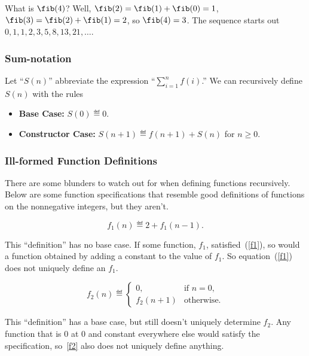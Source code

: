 What is $\fib(4)$?  Well, $\fib(2) =
\fib(1)+\fib(0) = 1$, $\fib(3) =
\fib(2)+\fib(1) = 2$, so $\fib(4) = 3$.  The sequence
starts out $0, 1, 1, 2, 3, 5, 8, 13, 21,\dots$.

\subsubsection{Sum-notation}

Let ``$S(n)$'' abbreviate the expression ``$\sum_{i=1}^n f(i)$.''  We
can recursively define $S(n)$ with the rules
\begin{itemize}
\item\textbf{Base Case:} $S(0) \eqdef 0$.
\item\textbf{Constructor Case:} $S(n+1) \eqdef  f(n+1) + S(n)$ for $n\geq 0$.
\end{itemize}

\subsubsection{Ill-formed Function Definitions}

There are some blunders to watch out for when defining functions
recursively.  Below are some function specifications that resemble
good definitions of functions on the nonnegative integers, but they
aren't.
\begin{definition}
\begin{equation}\label{f1}
f_1(n)\eqdef 2+f_1(n-1).
\end{equation}
\end{definition}
This ``definition'' has no base case.  If some function, $f_1$,
satisfied~(\ref{f1}), so would a function obtained by adding a constant to
the value of $f_1$.  So equation~(\ref{f1}) does not uniquely define
an $f_1$.

\begin{definition}
\begin{equation}\label{f2}
f_2(n) \eqdef \begin{cases}
                0,       & \text{if $n=0$},\\
                f_2(n+1) &  \text{otherwise}.
              \end{cases}
\end{equation}
\end{definition}
This ``definition'' has a base case, but still doesn't uniquely determine
$f_2$.  Any function that is 0 at 0 and constant everywhere else would
satisfy the specification, so~\eqref{f2} also does not uniquely define
anything.

